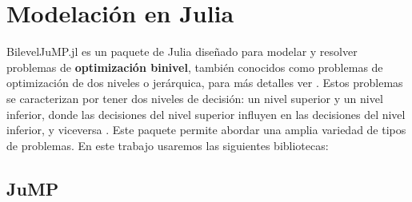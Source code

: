 \section{Modelación en Julia}
BilevelJuMP.jl es un paquete de Julia diseñado para modelar y resolver problemas de \textbf{optimización binivel}, también conocidos como problemas de optimización de dos niveles o jerárquica, para más detalles ver \cite{BilevelJump}.
Estos problemas se caracterizan por tener dos niveles de decisión: un nivel superior y un nivel inferior, donde las decisiones del nivel superior influyen en las decisiones del nivel inferior, y viceversa \cite{BilevelJump}.
Este paquete permite abordar una amplia variedad de tipos de problemas. En este trabajo usaremos las siguientes bibliotecas:
\subsection*{JuMP}
